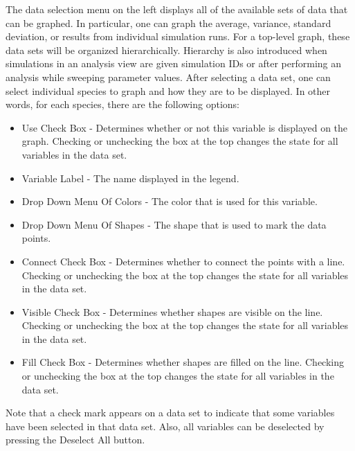 \documentclass[titlepage,11pt]{article}
\begin{document}
The data selection menu on the left displays all of the
available sets of data that can be graphed.  In particular, one can
graph the average, variance, standard deviation, or results from 
individual simulation runs.  For a top-level graph, these
data sets will be organized hierarchically.  Hierarchy is also 
introduced when simulations in an analysis view are given
simulation IDs or after performing an analysis while sweeping parameter
values.  After selecting a data set, one can select individual species to 
graph and how they are to be displayed.  In other words, for each 
species, there are the following options: 
\begin{itemize}
\item Use Check Box - Determines
whether or not this variable is displayed on the graph.  Checking or 
unchecking the box at the top changes the state for all variables in
the data set. 
\item Variable Label - The name displayed in the legend. 
\item Drop Down Menu Of Colors - The color that is used for this variable. 
\item Drop Down Menu Of Shapes - The shape that is used to mark the
  data points. 
\item Connect Check Box -
Determines whether to connect the points with a line. Checking or 
unchecking the box at the top changes the state for all variables in
the data set. 
\item Visible Check Box - Determines
whether shapes are visible on the line.  Checking or 
unchecking the box at the top changes the state for all variables in
the data set.
\item Fill Check Box - Determines whether shapes are filled
on the line.  Checking or 
unchecking the box at the top changes the state for all variables in
the data set.
\end{itemize}
Note that a check mark appears on a data set to indicate that some
variables have been selected in that data set.  Also, all variables can
be deselected by pressing the Deselect All button.
\end{document}
